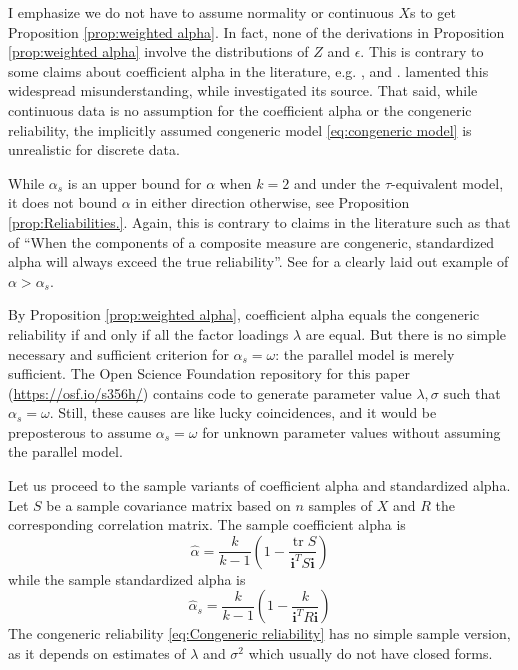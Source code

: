 \documentclass[twoside]{article}
\DeclareMathOperator{\tr}{tr}
\begin{document}
I emphasize we do not have to assume normality or continuous $X$s to get Proposition \ref{prop:weighted alpha}. In fact, none of the derivations in Proposition \ref{prop:weighted alpha} involve the distributions of $Z$ and $\epsilon$. This is contrary to some claims about coefficient alpha in the literature, e.g. \citep[][p.415]{McNeish2018-vu}, \citep[][p.21]{Zumbo2007-ap} and \citep[][p. 1185]{Zumbo2019-lm}. \citet{Raykov2019-yr} lamented this widespread misunderstanding, while \citet[][p. 1060]{Chalmers2018-fj} investigated its source. That said, while continuous data is no assumption for the coefficient alpha or the congeneric reliability, the implicitly assumed congeneric model \eqref{eq:congeneric model} is unrealistic for discrete data. 

While $\alpha_s$ is an upper bound for $\alpha$ when $k = 2$ and under the $\tau$-equivalent model, it does not bound $\alpha$ in either direction otherwise, see Proposition \ref{prop:Reliabilities.}. Again, this is contrary to claims in the literature such as that of \citep[][p.348]{Osburn2000-jd} \enquote{When the components of a composite measure are congeneric, standardized alpha will always exceed the true reliability}. See \citep[][p.450]{Falk2011-ae} for a clearly laid out example of $\alpha>\alpha_s$.

By Proposition \ref{prop:weighted alpha}, coefficient alpha equals the congeneric reliability if and only if all the factor loadings $\lambda$ are equal. But there is no simple necessary and sufficient criterion for $\alpha_s = \omega$: the parallel model is merely sufficient. The Open Science Foundation repository for this paper (\url{https://osf.io/s356h/}) contains code to generate parameter value $\lambda,\sigma$ such that $\alpha_s = \omega$. Still, these causes are like lucky coincidences, and it would be preposterous to assume $\alpha_s = \omega$ for unknown parameter values without assuming the parallel model.

Let us proceed to the sample variants of coefficient alpha and standardized
alpha. Let $S$ be a sample covariance matrix based on
$n$ samples of $X$ and $R$ the corresponding correlation matrix.
The sample coefficient alpha is 
\begin{equation}
\hat{\alpha}=\frac{k}{k-1}\left(1-\frac{\tr{S}}{\mathbf{i}^{T}S\mathbf{i}}\right)\label{eq:sample coefficient alpha}
\end{equation}
while the sample standardized alpha is
\begin{equation}
\hat{\alpha}_s=\frac{k}{k-1}\left(1-\frac{k}{\mathbf{i}^{T}R\mathbf{i}}\right)\label{eq:sample standardized alpha}
\end{equation}
The congeneric reliability \eqref{eq:Congeneric reliability} has no
simple sample version, as it depends on estimates of $\lambda$ and
$\sigma^{2}$ which usually do not have closed forms.
\end{document}

